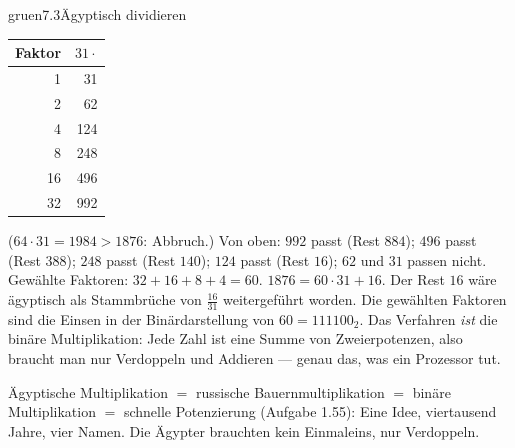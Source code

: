 \begin{loesungkarte}{gruen}{7.3}{Ägyptisch dividieren}
\begin{center}\small
\begin{tabular}{r|r}
Faktor & $31\cdot$ \\ \hline
1 & 31\\ 2 & 62\\ 4 & 124\\ 8 & 248\\ 16 & 496\\ 32 & 992
\end{tabular}
\end{center}
($64\cdot31 = 1984 > 1876$: Abbruch.)
Von oben: $992$ passt (Rest $884$); $496$ passt (Rest $388$); $248$ passt (Rest $140$); $124$ passt (Rest $16$); $62$ und $31$ passen nicht. Gewählte Faktoren: $32 + 16 + 8 + 4 = 60$. $1876 = 60\cdot31 + 16$. Der Rest $16$ wäre ägyptisch als Stammbrüche von $\frac{16}{31}$ weitergeführt worden.
Die gewählten Faktoren sind die Einsen in der Binärdarstellung von $60 = 111100_2$. Das Verfahren \emph{ist} die binäre Multiplikation: Jede Zahl ist eine Summe von Zweierpotenzen, also braucht man nur Verdoppeln und Addieren --- genau das, was ein Prozessor tut.
\begin{mitnehmen}\kastentext
Ägyptische Multiplikation $=$ russische Bauernmultiplikation $=$ binäre Multiplikation $=$ schnelle Potenzierung (Aufgabe 1.55): Eine Idee, viertausend Jahre, vier Namen. Die Ägypter brauchten kein Einmaleins, nur Verdoppeln.
\end{mitnehmen}
\end{loesungkarte}


